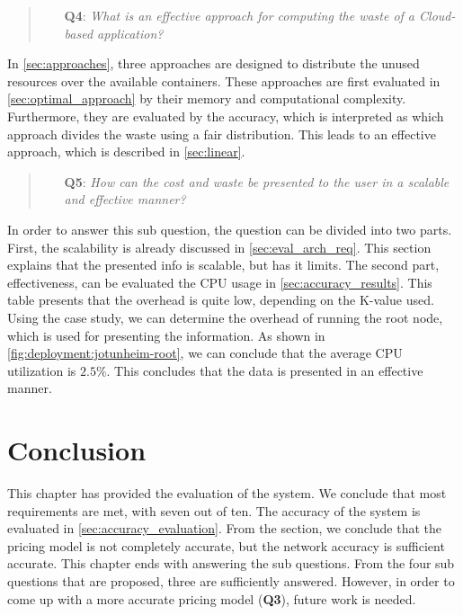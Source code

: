 \begin{quote}
    \begin{itemize}
        \item[\textbf{Q4}: ]\textit{What is an effective approach for computing the waste of a Cloud-based application?}
    \end{itemize}
\end{quote}
\noindent
In \autoref{sec:approaches}, three approaches are designed to distribute the unused resources over the available containers. These approaches are first evaluated in \autoref{sec:optimal_approach} by their memory and computational complexity. Furthermore, they are evaluated by the accuracy, which is interpreted as which approach divides the waste using a fair distribution. This leads to an effective approach, which is described in \autoref{sec:linear}.

\begin{quote}
    \begin{itemize}
        \item[\textbf{Q5}: ]\textit{How can the cost and waste be presented to the user in a scalable and effective manner?}
    \end{itemize}
\end{quote}
\noindent
In order to answer this sub question, the question can be divided into two parts. First, the scalability is already discussed in \autoref{sec:eval_arch_req}. This section explains that the presented info is scalable, but has it limits. The second part, effectiveness, can be evaluated the CPU usage in \autoref{sec:accuracy_results}. This table presents that the overhead is quite low, depending on the K-value used. Using the case study, we can determine the overhead of running the root node, which is used for presenting the information. As shown in \autoref{fig:deployment:jotunheim-root}, we can conclude that the average CPU utilization is $2.5\%$. This concludes that the data is presented in an effective manner. 

\section{Conclusion}
This chapter has provided the evaluation of the system. We conclude that most requirements are met, with seven out of ten. The accuracy of the system is evaluated in \autoref{sec:accuracy_evaluation}. From the section, we conclude that the pricing model is not completely accurate, but the network accuracy is sufficient accurate. This chapter ends with answering the sub questions. From the four sub questions that are proposed, three are sufficiently answered. However, in order to come up with a more accurate pricing model (\textbf{Q3}), future work is needed.